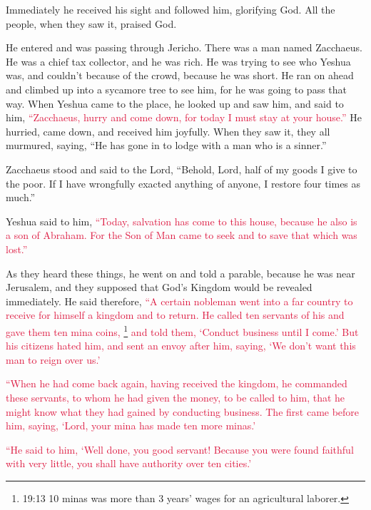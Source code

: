 \myverse{}Immediately he received his sight and followed him, glorifying
God. All the people, when they saw it, praised God.


\mychapter{} \myverse*{}He entered and was passing through Jericho.
\myverse{}There was a man named Zacchaeus. He was a chief tax collector, and he was rich.
\myverse{}He was trying to see who Yeshua was, and couldn’t because of the crowd, because
he was short.
\myverse{}He ran on ahead and climbed up into a sycamore tree to see him, for he was
going to pass that way.
\myverse{}When Yeshua came to the place, he looked up and saw him, and said to him,
\textcolor{crimson}{“Zacchaeus, hurry and come down, for today I must stay at your house.”
}
\myverse{}He hurried, came down, and received him joyfully.
\myverse{}When they saw it, they all murmured, saying, “He has gone in to lodge with
a man who is a sinner.”

\myverse{}Zacchaeus stood and said to the Lord, “Behold, Lord, half of my
goods I give to the poor. If I have wrongfully exacted anything of anyone, I restore four times as much.”

\myverse{}Yeshua said to him,
\textcolor{crimson}{“Today, salvation has come to this house, because he also is a son of Abraham.
}
\myverse{}\textcolor{crimson}{For the Son of Man came to seek and to save that which was lost.”
}

\myverse{}As they heard these things, he went on and told a parable, because
he was near Jerusalem, and they supposed that God’s Kingdom would be revealed immediately.
\myverse{}He said therefore,
\textcolor{crimson}{“A certain nobleman went into a far country to receive for himself a kingdom and to return.
}
\myverse{}\textcolor{crimson}{He called ten servants of his and gave them ten mina coins,
}\footnote{19:13 10 minas was more than 3 years’ wages for an agricultural laborer.
}
\textcolor{crimson}{and told them, ‘Conduct business until I come.’
}
\myverse{}\textcolor{crimson}{But his citizens hated him, and sent an envoy after him, saying, ‘We don’t want this man to reign over us.’}

\myverse{}\textcolor{crimson}{“When he had come back again, having received the kingdom, he commanded these servants, to whom he had given the money, to be called to him, that he might know what they had gained by conducting business.} \myverse{}\textcolor{crimson}{The first came before him, saying, ‘Lord, your mina has made ten more minas.’}

\myverse{}\textcolor{crimson}{“He said to him, ‘Well done, you good servant! Because you
	were found faithful with very little, you shall have authority over ten cities.’
}

